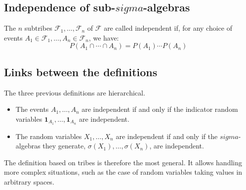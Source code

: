 \subsection{Independence of sub-$sigma$-algebras}%
\begin{definition}
The $n$ subtribes $\mathcal{F}_1, \ldots, \mathcal{F}_n$ of $\mathcal{F}$ are called independent if, for any choice of events $A_1 \in \mathcal{F}_1, \ldots, A_n \in \mathcal{F}_n$, we have:
\[ P(A_1 \cap \cdots \cap A_n) = P(A_1) \cdots P(A_n) \]
\end{definition}%
\subsection{Links between the definitions}%
The three previous definitions are hierarchical.%
\begin{itemize}
    \item The events $A_1, \ldots, A_n$ are independent if and only if the indicator random variables $\mathbf{1}_{A_1}, \ldots, \mathbf{1}_{A_n}$ are independent.
    \item The random variables $X_1, \ldots, X_n$ are independent if and only if the $sigma$-algebras they generate, $\sigma(X_1), \ldots, \sigma(X_n)$, are independent.
\end{itemize}%
The definition based on tribes is therefore the most general. It allows handling more complex situations, such as the case of random variables taking values in arbitrary spaces.%
